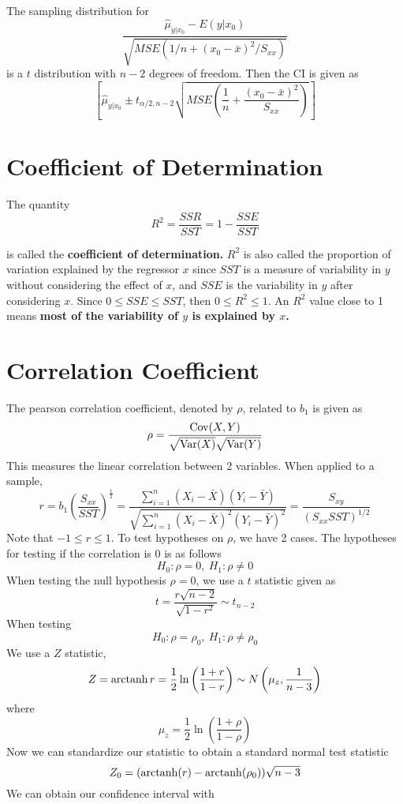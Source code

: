 The sampling distribution for 
\[\frac{\hat{\mu}_{y|x_0} - E(y|x_0)}{\sqrt{MSE(1/n + (x_0-\bar{x})^2/S_{xx})}}\]
is a $t$ distribution with $n-2$ degrees of freedom. Then the CI is given as 
\[\left[\hat{\mu}_{y|x_0} \pm t_{\alpha/2, n-2}\sqrt{MSE\left(\frac{1}{n} + \frac{(x_0 - \bar{x})^2}{S_{xx}}\right)} \right]\]

\section{Coefficient of Determination}

The quantity 
\[R^2 = \frac{SSR}{SST} = 1 - \frac{SSE}{SST}\]

is called the \textbf{coefficient of determination.} $R^2$ is also called the proportion of variation explained by the regressor $x$ since $SST$ is a measure of variability in $y$ without considering the effect of $x$, and $SSE$ is the variability in $y$ after considering $x$. Since $0 \leq SSE \leq SST$, then $0 \leq R^2 \leq 1$. An $R^2$ value close to 1 means \textbf{most of the variability of $y$ is explained by $x$.}  


\section{Correlation Coefficient}

The pearson correlation coefficient, denoted by $\rho$, related to $b_1$ is given as
\[\rho = \frac{\operatorname{Cov}(X,Y)}{\sqrt{\operatorname{Var}(X)}\sqrt{\operatorname{Var}(Y)}}\]
This measures the linear correlation between 2 variables. When applied to a sample, 
\[r = b_1\left(\frac{S_{xx}}{SST}\right)^{\frac{1}{2}} = \frac{\sum_{i=1}^n(X_i - \bar{X})(Y_i - \bar{Y})}{\sqrt{\sum_{i=1}^n (X_i - \bar{X})^2(Y_i - \bar{Y})^2}} = \frac{S_{xy}}{(S_{xx}SST)^{1/2}}\]
Note that $-1 \leq r \leq 1$. To test hypotheses on $\rho$, we have 2 cases. The hypotheses for testing if the correlation is 0 is as follows 
\[H_0: \rho = 0, \ H_1: \rho \neq 0\]
When testing the null hypothesis $\rho = 0$, we use a $t$ statistic given as 
\[t = \frac{r\sqrt{n-2}}{\sqrt{1-r^2}} \sim t_{n-2}\]
When testing 
\[H_0: \rho = \rho_0, \ H_1: \rho \neq \rho_0\]
We use a $Z$ statistic, 
\[Z = \operatorname{arctanh} r = \frac{1}{2}\ln \left(\frac{1+r}{1-r}\right) \sim N\left(\mu_z, \frac{1}{n-3}\right)\]
where 
\[\mu_z = \frac{1}{2}\ln\left(\frac{1+\rho}{1 - \rho}\right)\]
Now we can standardize our statistic to obtain a standard normal test statistic
\[Z_0 = (\operatorname{arctanh}(r) - \operatorname{arctanh}(\rho_0))\sqrt{n-3}\]
We can obtain our confidence interval with 